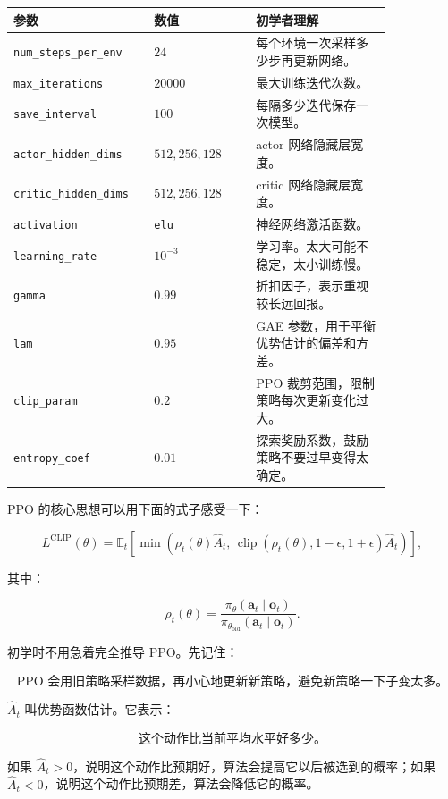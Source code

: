 \documentclass[UTF8,11pt,a4paper]{ctexart}
\newcommand{\bs}[1]{\bm{#1}}
\begin{document}
\begin{center}
\begin{tabular}{p{0.28\linewidth}p{0.24\linewidth}p{0.32\linewidth}}
\toprule
参数 & 数值 & 初学者理解 \\
\midrule
\texttt{num\_steps\_per\_env} & \(24\) & 每个环境一次采样多少步再更新网络。\\
\texttt{max\_iterations} & \(20000\) & 最大训练迭代次数。\\
\texttt{save\_interval} & \(100\) & 每隔多少迭代保存一次模型。\\
\texttt{actor\_hidden\_dims} & \(512,256,128\) & actor 网络隐藏层宽度。\\
\texttt{critic\_hidden\_dims} & \(512,256,128\) & critic 网络隐藏层宽度。\\
\texttt{activation} & \texttt{elu} & 神经网络激活函数。\\
\texttt{learning\_rate} & \(10^{-3}\) & 学习率。太大可能不稳定，太小训练慢。\\
\texttt{gamma} & \(0.99\) & 折扣因子，表示重视较长远回报。\\
\texttt{lam} & \(0.95\) & GAE 参数，用于平衡优势估计的偏差和方差。\\
\texttt{clip\_param} & \(0.2\) & PPO 裁剪范围，限制策略每次更新变化过大。\\
\texttt{entropy\_coef} & \(0.01\) & 探索奖励系数，鼓励策略不要过早变得太确定。\\
\bottomrule
\end{tabular}
\end{center}

PPO 的核心思想可以用下面的式子感受一下：

\[
L^{\mathrm{CLIP}}(\theta)
=
\mathbb E_t
\left[
\min
\left(
\rho_t(\theta)\hat A_t,\,
\operatorname{clip}
\left(
\rho_t(\theta),1-\epsilon,1+\epsilon
\right)
\hat A_t
\right)
\right],
\]

其中：

\[
\rho_t(\theta)
=
\frac{
\pi_\theta(\bs a_t\mid \bs o_t)
}{
\pi_{\theta_{\mathrm{old}}}(\bs a_t\mid \bs o_t)
}.
\]

初学时不用急着完全推导 PPO。先记住：

\[
\boxed{
\text{PPO 会用旧策略采样数据，再小心地更新新策略，避免新策略一下子变太多。}
}
\]

\(\hat A_t\) 叫优势函数估计。它表示：

\[
\boxed{
\text{这个动作比当前平均水平好多少。}
}
\]

如果 \(\hat A_t>0\)，说明这个动作比预期好，算法会提高它以后被选到的概率；如果 \(\hat A_t<0\)，说明这个动作比预期差，算法会降低它的概率。
\end{document}
